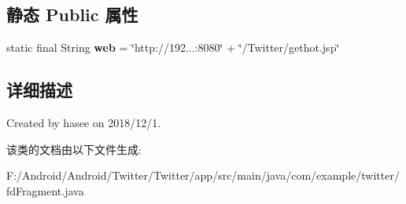 \subsection*{静态 Public 属性}
\begin{DoxyCompactItemize}
\item 
\mbox{\label{classcom_1_1example_1_1twitter_1_1fd_fragment_af743db5f4e4f334135eb560955965854}} 
static final String {\bfseries web} = \char`\"{}http\+://192...\+:8080\char`\"{} + \char`\"{}/Twitter/gethot.\+jsp\char`\"{}
\end{DoxyCompactItemize}


\subsection{详细描述}
Created by hasee on 2018/12/1. 

该类的文档由以下文件生成\+:\begin{DoxyCompactItemize}
\item 
F\+:/\+Android/\+Android/\+Twitter/\+Twitter/app/src/main/java/com/example/twitter/fd\+Fragment.\+java\end{DoxyCompactItemize}
